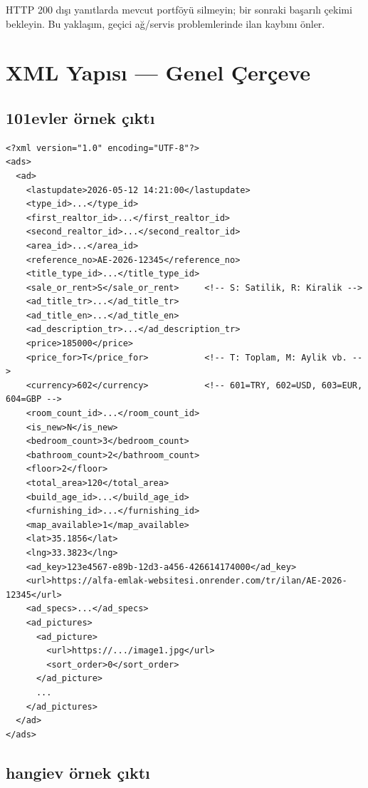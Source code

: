 \documentclass[11pt,a4paper]{article}
\begin{document}
\begin{okbox}
HTTP 200 dışı yanıtlarda mevcut portföyü silmeyin; bir sonraki başarılı çekimi bekleyin. Bu yaklaşım, geçici ağ/servis problemlerinde ilan kaybını önler.
\end{okbox}

\section{XML Yapısı — Genel Çerçeve}

\subsection{101evler örnek çıktı}

\begin{lstlisting}[style=xmlstyle]
<?xml version="1.0" encoding="UTF-8"?>
<ads>
  <ad>
    <lastupdate>2026-05-12 14:21:00</lastupdate>
    <type_id>...</type_id>
    <first_realtor_id>...</first_realtor_id>
    <second_realtor_id>...</second_realtor_id>
    <area_id>...</area_id>
    <reference_no>AE-2026-12345</reference_no>
    <title_type_id>...</title_type_id>
    <sale_or_rent>S</sale_or_rent>     <!-- S: Satilik, R: Kiralik -->
    <ad_title_tr>...</ad_title_tr>
    <ad_title_en>...</ad_title_en>
    <ad_description_tr>...</ad_description_tr>
    <price>185000</price>
    <price_for>T</price_for>           <!-- T: Toplam, M: Aylik vb. -->
    <currency>602</currency>           <!-- 601=TRY, 602=USD, 603=EUR, 604=GBP -->
    <room_count_id>...</room_count_id>
    <is_new>N</is_new>
    <bedroom_count>3</bedroom_count>
    <bathroom_count>2</bathroom_count>
    <floor>2</floor>
    <total_area>120</total_area>
    <build_age_id>...</build_age_id>
    <furnishing_id>...</furnishing_id>
    <map_available>1</map_available>
    <lat>35.1856</lat>
    <lng>33.3823</lng>
    <ad_key>123e4567-e89b-12d3-a456-426614174000</ad_key>
    <url>https://alfa-emlak-websitesi.onrender.com/tr/ilan/AE-2026-12345</url>
    <ad_specs>...</ad_specs>
    <ad_pictures>
      <ad_picture>
        <url>https://.../image1.jpg</url>
        <sort_order>0</sort_order>
      </ad_picture>
      ...
    </ad_pictures>
  </ad>
</ads>
\end{lstlisting}

\subsection{hangiev örnek çıktı}
\end{document}
